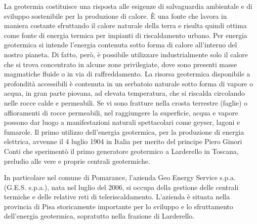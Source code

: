 \documentclass[laurea,oneside,11pt]{USiena_tesiLM3}
\begin{document}
La geotermia costituisce una risposta alle esigenze di salvaguardia ambientale e di sviluppo sostenibile per la produzione di calore. È una fonte che lavora in maniera costante sfruttando il calore naturale della terra e risulta quindi ottima come fonte di energia termica per impianti di riscaldamento urbano.
Per energia geotermica si intende l'energia contenuta sotto forma di calore all'interno del nostro pianeta. Di fatto, però, è possibile utilizzare industrialmente solo il calore che si trova concentrato in alcune zone privilegiate, dove sono presenti masse magmatiche fluide o in via di raffreddamento. La risorsa geotermica disponibile a profondità accessibili è contenuta in un serbatoio naturale sotto forma di vapore o acqua, in gran parte piovana, ad elevata temperatura, che si riscalda circolando nelle rocce calde e permeabili. Se vi sono fratture nella crosta terrestre (faglie) o affioramenti di rocce permeabili, nel raggiungere la superficie, acqua e vapore possono dar luogo a manifestazioni naturali spettacolari come geyser, lagoni e fumarole.
Il primo utilizzo dell'energia geotermica, per la produzione di energia elettrica, avvenne il 4 luglio 1904 in Italia per merito del principe Piero Ginori Conti che sperimentò il primo generatore geotermico a Larderello in Toscana, preludio alle vere e proprie centrali geotermiche.
  
In particolare nel comune di Pomarance, l'azienda Geo Energy Service s.p.a. (G.E.S. s.p.a.), nata nel luglio del 2006, si occupa della gestione delle centrali termiche e delle relative reti di teleriscaldamento. L'azienda è situata nella provincia di Pisa storicamente importante per lo sviluppo e lo sfruttamento dell'energia geotermica, sopratutto nella frazione di Larderello.
\end{document}
